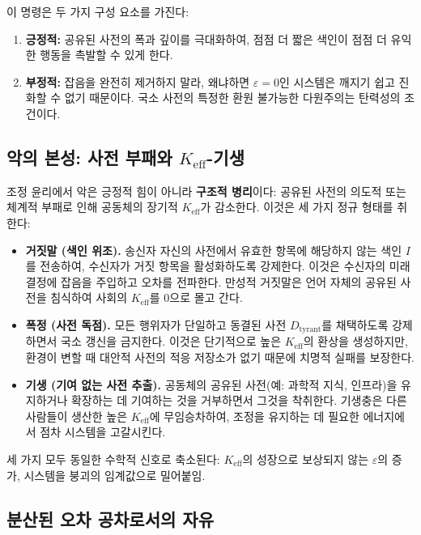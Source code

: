 \documentclass[12pt,a4paper]{article}
\begin{document}
	이 명령은 두 가지 구성 요소를 가진다:
	\begin{enumerate}[leftmargin=*]
		\item \textbf{긍정적:} 공유된 사전의 폭과 깊이를 극대화하여, 점점 더 짧은 색인이 점점 더 유익한 행동을 촉발할 수 있게 한다.
		\item \textbf{부정적:} 잡음을 완전히 제거하지 말라, 왜냐하면 \(\varepsilon = 0\)인 시스템은 깨지기 쉽고 진화할 수 없기 때문이다. 국소 사전의 특정한 환원 불가능한 다원주의는 탄력성의 조건이다.
	\end{enumerate}
	
	\subsection{악의 본성: 사전 부패와 \(K_{\mathrm{eff}}\)-기생}
	
	조정 윤리에서 악은 긍정적 힘이 아니라 \textbf{구조적 병리}이다: 공유된 사전의 의도적 또는 체계적 부패로 인해 공동체의 장기적 \(K_{\mathrm{eff}}\)가 감소한다. 이것은 세 가지 정규 형태를 취한다:
	
	\begin{itemize}[leftmargin=*]
		\item \textbf{거짓말 (색인 위조).} 송신자 자신의 사전에서 유효한 항목에 해당하지 않는 색인 \(I\)를 전송하여, 수신자가 거짓 항목을 활성화하도록 강제한다. 이것은 수신자의 미래 결정에 잡음을 주입하고 오차를 전파한다. 만성적 거짓말은 언어 자체의 공유된 사전을 침식하여 사회의 \(K_{\mathrm{eff}}\)를 0으로 몰고 간다.
		\item \textbf{폭정 (사전 독점).} 모든 행위자가 단일하고 동결된 사전 \(D_{\text{tyrant}}\)를 채택하도록 강제하면서 국소 갱신을 금지한다. 이것은 단기적으로 높은 \(K_{\mathrm{eff}}\)의 환상을 생성하지만, 환경이 변할 때 대안적 사전의 적응 저장소가 없기 때문에 치명적 실패를 보장한다.
		\item \textbf{기생 (기여 없는 사전 추출).} 공동체의 공유된 사전(예: 과학적 지식, 인프라)을 유지하거나 확장하는 데 기여하는 것을 거부하면서 그것을 착취한다. 기생충은 다른 사람들이 생산한 높은 \(K_{\mathrm{eff}}\)에 무임승차하여, 조정을 유지하는 데 필요한 에너지에서 점차 시스템을 고갈시킨다.
	\end{itemize}
	
	세 가지 모두 동일한 수학적 신호로 축소된다: \(K_{\mathrm{eff}}\)의 성장으로 보상되지 않는 \(\varepsilon\)의 증가, 시스템을 붕괴의 임계값으로 밀어붙임.
	
	\subsection{분산된 오차 공차로서의 자유}
	
\end{document}

